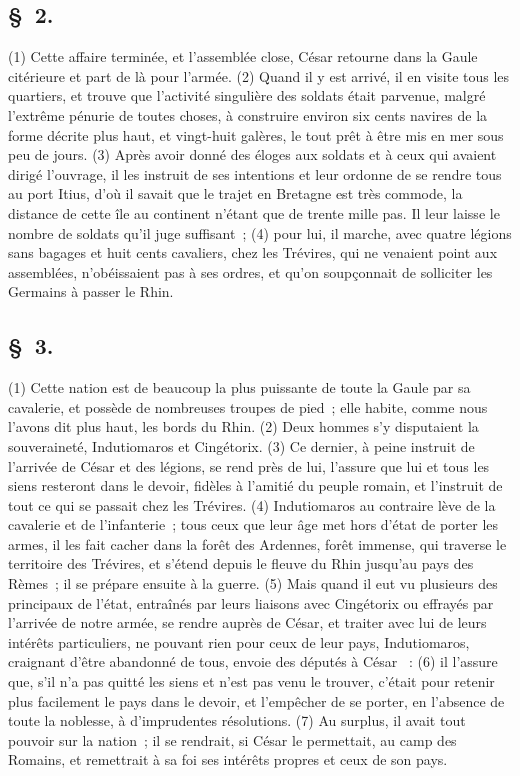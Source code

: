 \documentclass[french,twoside]{book} %
\begin{document}
\subsection[{§ 2.}]{ \textsc{§ 2.} }
\noindent (1) Cette affaire terminée, et l’assemblée close, César retourne dans la Gaule citérieure et part de là pour l’armée. (2) Quand il y est arrivé, il en visite tous les quartiers, et trouve que l’activité singulière des soldats était parvenue, malgré l’extrême pénurie de toutes choses, à construire environ six cents navires de la forme décrite plus haut, et vingt-huit galères, le tout prêt à être mis en mer sous peu de jours. (3) Après avoir donné des éloges aux soldats et à ceux qui avaient dirigé l’ouvrage, il les instruit de ses intentions et leur ordonne de se rendre tous au port Itius, d’où il savait que le trajet en Bretagne est très commode, la distance de cette île au continent n’étant que de trente mille pas. Il leur laisse le nombre de soldats qu’il juge suffisant ; (4) pour lui, il marche, avec quatre légions sans bagages et huit cents cavaliers, chez les Trévires, qui ne venaient point aux assemblées, n’obéissaient pas à ses ordres, et qu’on soupçonnait de solliciter les Germains à passer le Rhin.
\subsection[{§ 3.}]{ \textsc{§ 3.} }
\noindent (1) Cette nation est de beaucoup la plus puissante de toute la Gaule par sa cavalerie, et possède de nombreuses troupes de pied ; elle habite, comme nous l’avons dit plus haut, les bords du Rhin. (2) Deux hommes s’y disputaient la souveraineté, Indutiomaros et Cingétorix. (3) Ce dernier, à peine instruit de l’arrivée de César et des légions, se rend près de lui, l’assure que lui et tous les siens resteront dans le devoir, fidèles à l’amitié du peuple romain, et l’instruit de tout ce qui se passait chez les Trévires. (4) Indutiomaros au contraire lève de la cavalerie et de l’infanterie ; tous ceux que leur âge met hors d’état de porter les armes, il les fait cacher dans la forêt des Ardennes, forêt immense, qui traverse le territoire des Trévires, et s’étend depuis le fleuve du Rhin jusqu’au pays des Rèmes ; il se prépare ensuite à la guerre. (5) Mais quand il eut vu plusieurs des principaux de l’état, entraînés par leurs liaisons avec Cingétorix ou effrayés par l’arrivée de notre armée, se rendre auprès de César, et traiter avec lui de leurs intérêts particuliers, ne pouvant rien pour ceux de leur pays, Indutiomaros, craignant d’être abandonné de tous, envoie des députés à César  : (6) il l’assure que, s’il n’a pas quitté les siens et n’est pas venu le trouver, c’était pour retenir plus facilement le pays dans le devoir, et l’empêcher de se porter, en l’absence de toute la noblesse, à d’imprudentes résolutions. (7) Au surplus, il avait tout pouvoir sur la nation ; il se rendrait, si César le permettait, au camp des Romains, et remettrait à sa foi ses intérêts propres et ceux de son pays.
\end{document}
